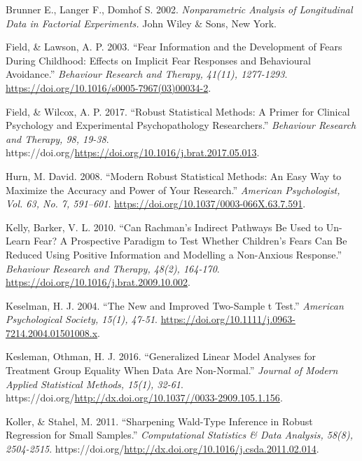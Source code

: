 \documentclass[
]{article}
\newlength{\cslhangindent}
\newenvironment{CSLReferences}[2] %
 {\begin{list}{}{%
  \setlength{\itemindent}{0pt}
  \setlength{\leftmargin}{0pt}
  \setlength{\parsep}{0pt}
  \ifodd #1
   \setlength{\leftmargin}{\cslhangindent}
   \setlength{\itemindent}{-1\cslhangindent}
  \fi
  \setlength{\itemsep}{#2\baselineskip}}}
 {\end{list}}
\begin{document}
\label{refs}
\begin{CSLReferences}{1}{0}
Brunner E., Langer F., Domhof S. 2002. \emph{Nonparametric Analysis of Longitudinal Data in Factorial Experiments.} {John Wiley \& Sons, New York.}

Field, \& Lawson, A. P. 2003. {``Fear Information and the Development of Fears During Childhood: Effects on Implicit Fear Responses and Behavioural Avoidance.''} \emph{Behaviour Research and Therapy, 41(11), 1277-1293}. \url{https://doi.org/10.1016/s0005-7967(03)00034-2}.

Field, \& Wilcox, A. P. 2017. {``Robust Statistical Methods: A Primer for Clinical Psychology and Experimental Psychopathology Researchers.''} \emph{Behaviour Research and Therapy, 98, 19-38}. https://doi.org/\url{https://doi.org/10.1016/j.brat.2017.05.013}.

Hurn, M. David. 2008. {``Modern Robust Statistical Methods: An Easy Way to Maximize the Accuracy and Power of Your Research.''} \emph{American Psychologist, Vol. 63, No. 7, 591--601}. \url{https://doi.org/10.1037/0003-066X.63.7.591}.

Kelly, Barker, V. L. 2010. {``Can Rachman's Indirect Pathways Be Used to Un-Learn Fear? A Prospective Paradigm to Test Whether Children's Fears Can Be Reduced Using Positive Information and Modelling a Non-Anxious Response.''} \emph{Behaviour Research and Therapy, 48(2), 164-170}. \url{https://doi.org/10.1016/j.brat.2009.10.002}.

Keselman, H. J. 2004. {``The New and Improved Two-Sample t Test.''} \emph{American Psychological Society, 15(1), 47-51}. \url{https://doi.org/10.1111/j.0963-7214.2004.01501008.x}.

Kesleman, Othman, H. J. 2016. {``Generalized Linear Model Analyses for Treatment Group Equality When Data Are Non-Normal.''} \emph{Journal of Modern Applied Statistical Methods, 15(1), 32-61}. https://doi.org/\url{http://dx.doi.org/10.1037//0033-2909.105.1.156}.

Koller, \& Stahel, M. 2011. {``Sharpening Wald-Type Inference in Robust Regression for Small Samples.''} \emph{Computational Statistics \& Data Analysis, 58(8), 2504-2515}. https://doi.org/\url{http://dx.doi.org/10.1016/j.csda.2011.02.014}.


\end{CSLReferences}
\end{document}
